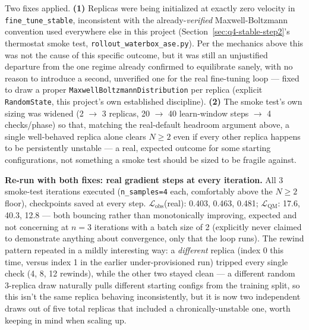 \documentclass[11pt]{article}
\begin{document}
Two fixes applied. \textbf{(1)} Replicas were being initialized at exactly
zero velocity in \texttt{fine\_tune\_stable}, inconsistent with the
already-\emph{verified} Maxwell-Boltzmann convention used everywhere else
in this project (Section~\ref{sec:q4-stable-step2}'s thermostat smoke
test, \texttt{rollout\_waterbox\_ase.py}). Per the mechanics above this
was not the cause of this specific outcome, but it was still an
unjustified departure from the one regime already confirmed to equilibrate
sanely, with no reason to introduce a second, unverified one for the real
fine-tuning loop --- fixed to draw a proper \texttt{MaxwellBoltzmannDistribution}
per replica (explicit \texttt{RandomState}, this project's own established
discipline). \textbf{(2)} The smoke test's own sizing was widened (2
$\to$ 3 replicas, 20 $\to$ 40 learn-window steps $\to$ 4 checks/phase) so
that, matching the real-default headroom argument above, a single
well-behaved replica alone clears $N{\ge}2$ even if every other replica
happens to be persistently unstable --- a real, expected outcome for some
starting configurations, not something a smoke test should be sized to be
fragile against.

\textbf{Re-run with both fixes: real gradient steps at every iteration.}
All 3 smoke-test iterations executed (\texttt{n\_samples=4} each,
comfortably above the $N{\ge}2$ floor), checkpoints saved at every step.
$\mathcal{L}_{\text{obs}}$(real): 0.403, 0.463, 0.481;
$\mathcal{L}_{\text{QM}}$: 17.6, 40.3, 12.8 --- both bouncing rather than
monotonically improving, expected and not concerning at $n{=}3$ iterations
with a batch size of 2 (explicitly never claimed to demonstrate anything
about convergence, only that the loop runs). The rewind pattern repeated
in a mildly interesting way: a \emph{different} replica (index 0 this
time, versus index 1 in the earlier under-provisioned run) tripped every
single check (4, 8, 12 rewinds), while the other two stayed clean --- a
different random 3-replica draw naturally pulls different starting
configs from the training split, so this isn't the same replica behaving
inconsistently, but it is now two independent draws out of five total
replicas that included a chronically-unstable one, worth keeping in mind
when scaling up.
\end{document}
